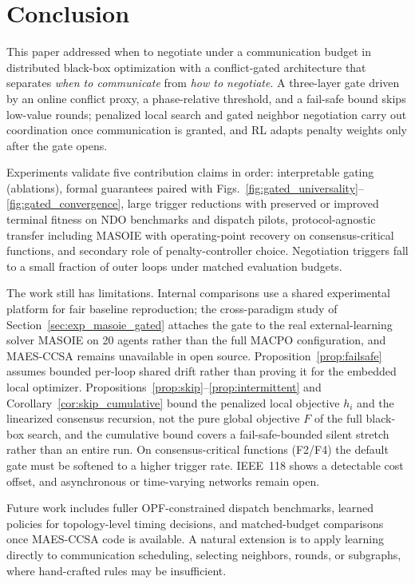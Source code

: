 \documentclass[conference]{IEEEtran}
\begin{document}
\section{Conclusion}\label{sec:conclusion}
This paper addressed when to negotiate under a communication budget in distributed black-box optimization with a conflict-gated architecture that separates \emph{when to communicate} from \emph{how to negotiate}. A three-layer gate driven by an online conflict proxy, a phase-relative threshold, and a fail-safe bound skips low-value rounds; penalized local search and gated neighbor negotiation carry out coordination once communication is granted, and RL adapts penalty weights only after the gate opens.

Experiments validate five contribution claims in order: interpretable gating (ablations), formal guarantees paired with Figs.~\ref{fig:gated_universality}--\ref{fig:gated_convergence}, large trigger reductions with preserved or improved terminal fitness on NDO benchmarks and dispatch pilots, protocol-agnostic transfer including MASOIE with operating-point recovery on consensus-critical functions, and secondary role of penalty-controller choice. Negotiation triggers fall to a small fraction of outer loops under matched evaluation budgets.

The work still has limitations. Internal comparisons use a shared experimental platform for fair baseline reproduction; the cross-paradigm study of Section~\ref{sec:exp_masoie_gated} attaches the gate to the real external-learning solver MASOIE on 20 agents rather than the full MACPO configuration, and MAES-CCSA remains unavailable in open source. Proposition~\ref{prop:failsafe} assumes bounded per-loop shared drift rather than proving it for the embedded local optimizer. Propositions~\ref{prop:skip}--\ref{prop:intermittent} and Corollary~\ref{cor:skip_cumulative} bound the penalized local objective $h_i$ and the linearized consensus recursion, not the pure global objective $F$ of the full black-box search, and the cumulative bound covers a fail-safe-bounded silent stretch rather than an entire run. On consensus-critical functions (F2/F4) the default gate must be softened to a higher trigger rate. IEEE~118 shows a detectable cost offset, and asynchronous or time-varying networks remain open.

Future work includes fuller OPF-constrained dispatch benchmarks, learned policies for topology-level timing decisions, and matched-budget comparisons once MAES-CCSA code is available.\label{sec:future_rl} A natural extension is to apply learning directly to communication scheduling, selecting neighbors, rounds, or subgraphs, where hand-crafted rules may be insufficient.
\end{document}
